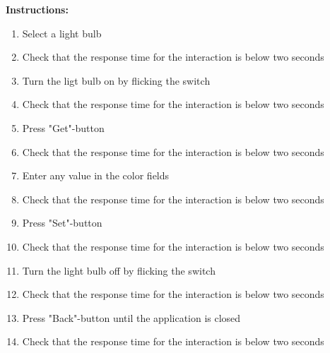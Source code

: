 \documentclass[a4paper]{article}
\newlength{\testlabellength}
\newenvironment{testlist}{\begin{enumerate}[label=\bfseries Instruction \thesubsection.\arabic* , labelindent=0pt, labelwidth=\testlabellength , leftmargin=2cm]}{\end{enumerate}}
\newenvironment{instruction}{
\textbf{Instructions:}
\begin{enumerate}[label=\bfseries  \arabic*., labelindent=0cm, labelwidth=2cm , leftmargin=1cm]
}
{\end{enumerate}}
\begin{document}
\begin{appendices}
\begin{testlist}
\begin{instruction}
            \item Select a light bulb
            \item Check that the response time for the interaction is below two seconds
            \item Turn the ligt bulb on by flicking the switch
            \item Check that the response time for the interaction is below two seconds
            \item Press "Get"-button
            \item Check that the response time for the interaction is below two seconds
            \item Enter any value in the color fields
            \item Check that the response time for the interaction is below two seconds
            \item Press "Set"-button
            \item Check that the response time for the interaction is below two seconds
            \item Turn the light bulb off by flicking the switch
            \item Check that the response time for the interaction is below two seconds
            \item Press "Back"-button until the application is closed
            \item Check that the response time for the interaction is below two seconds
		\end{instruction}



\end{testlist}
\end{appendices}
\end{document}
